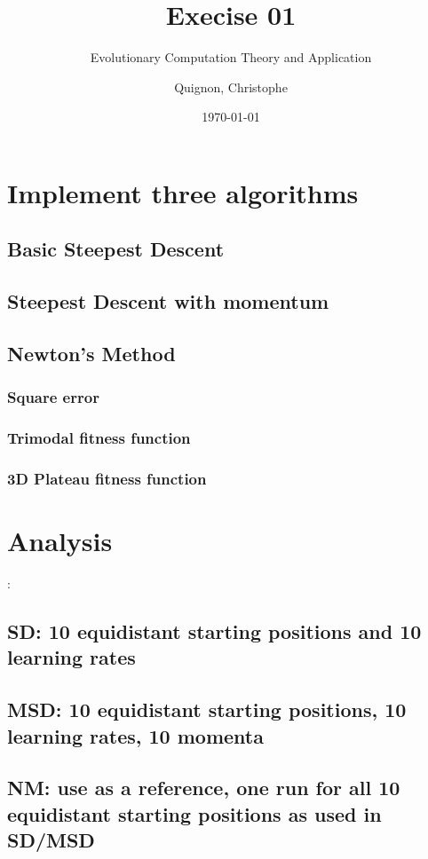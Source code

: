 \documentclass{scrartcl}
\begin{document}
\title{Execise 01}
\subtitle{ Evolutionary Computation Theory and Application}
\author{
  Quignon, Christophe \\
} 
\date{\today}


\maketitle

\section{Implement three algorithms}
\subsection{Basic Steepest Descent}
\subsection{Steepest Descent with momentum}
\subsection{Newton’s Method}
\subsubsection{Square error}
\subsubsection{Trimodal fitness function}
\subsubsection{3D Plateau fitness function}

\section{Analysis}:
\subsection{SD: 10 equidistant starting positions and 10 learning rates}
\subsection{MSD: 10 equidistant starting positions, 10 learning rates, 10 momenta}
\subsection{NM: use as a reference, one run for all 10 equidistant starting positions
as used in SD/MSD}
\end{document}
